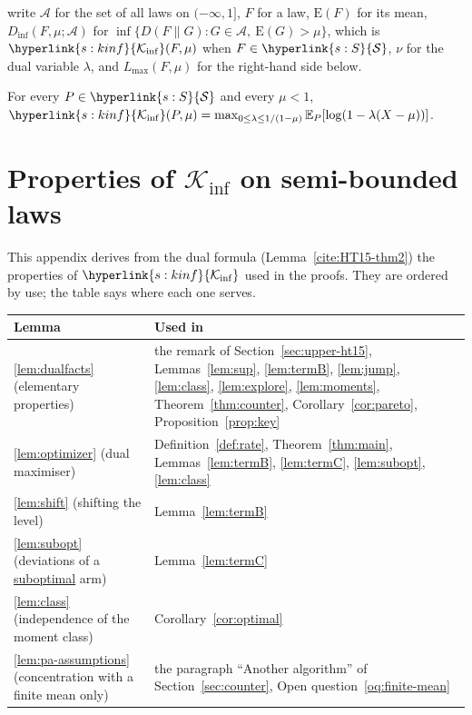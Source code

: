 \documentclass[11pt]{article}
\newcommand{\E}{\mathbb{E}}
\newcommand{\sy}[2]{{\hyperlink{#1}{#2}}}
\newcommand{\term}[2]{\hyperlink{#1}{#2}}
\newcommand{\Sm}{\sy{s:S}{\mathcal{S}}}
\newcommand{\Kinf}{\sy{s:kinf}{\mathcal{K}_{\inf}}}
\begin{document}
\citet{HT15} write $\mathcal A$ for the set of all laws on $(-\infty,1]$, $F$ for a law, $\mathrm
E(F)$ for its mean, $D_{\inf}(F,\mu;\mathcal A)$ for $\inf\{D(F\|G):G\in\mathcal A,\ \mathrm
E(G)>\mu\}$, which is $\Kinf(F,\mu)$ when $F\in\Sm$, $\nu$ for the dual variable $\lambda$, and
$L_{\max}(F,\mu)$ for the right-hand side below.

\begin{lemma}\label{cite:HT15-thm2}
For every $P\in\Sm$ and every $\mu<1$,
$\Kinf(P,\mu)=\max_{0\le\lambda\le1/(1-\mu)}\E_P[\log(1-\lambda(X-\mu))]$.
\end{lemma}

\section{Properties of \texorpdfstring{$\mathcal{K}_{\inf}$}{Kinf} on semi-bounded laws}\label{sec:dual}

This appendix derives from the dual formula (Lemma~\ref{cite:HT15-thm2}) the properties of $\Kinf$
used in the proofs. They are ordered by use; the table says where each one serves.


\begin{center}
\small
\begin{tabular}{@{}p{}p{}@{}}
\toprule
Lemma & Used in \\
\midrule
\ref{lem:dualfacts} (elementary properties) & the remark of Section~\ref{sec:upper-ht15}, Lemmas~\ref{lem:sup}, \ref{lem:termB}, \ref{lem:jump}, \ref{lem:class}, \ref{lem:explore}, \ref{lem:moments}, Theorem~\ref{thm:counter}, Corollary~\ref{cor:pareto}, Proposition~\ref{prop:key} \\
\ref{lem:optimizer} (dual maximiser) & Definition~\ref{def:rate}, Theorem~\ref{thm:main}, Lemmas~\ref{lem:termB}, \ref{lem:termC}, \ref{lem:subopt}, \ref{lem:class} \\
\ref{lem:shift} (shifting the level) & Lemma~\ref{lem:termB} \\
\ref{lem:subopt} (deviations of a \term{w:subopt}{suboptimal} arm) & Lemma~\ref{lem:termC} \\
\ref{lem:class} (independence of the moment class) & Corollary~\ref{cor:optimal} \\
\ref{lem:pa-assumptions} (concentration with a finite mean only) & the paragraph ``Another algorithm'' of Section~\ref{sec:counter}, Open question~\ref{oq:finite-mean} \\
\bottomrule
\end{tabular}
\end{center}
\end{document}
